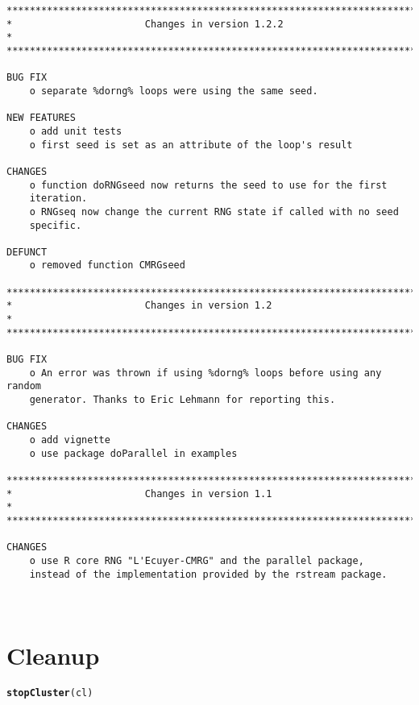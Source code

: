 \documentclass[a4paper,12pt]{article}\usepackage{graphicx, color}
\makeatletter
\newcommand{\hlfunctioncall}[1]{\textcolor[rgb]{0.501960784313725,0,0.329411764705882}{\textbf{#1}}}%
\newenvironment{kframe}{%
 \def\at@end@of@kframe{}%
 \ifinner\ifhmode%
  \def\at@end@of@kframe{\end{minipage}}%
  \begin{minipage}{\columnwidth}%
 \fi\fi%
 \def\FrameCommand##1{\hskip\@totalleftmargin \hskip-\fboxsep
 \colorbox{shadecolor}{##1}\hskip-\fboxsep
     \hskip-\linewidth \hskip-\@totalleftmargin \hskip\columnwidth}%
 \MakeFramed {\advance\hsize-\width
   \@totalleftmargin\z@ \linewidth\hsize
   \@setminipage}}%
 {\par\unskip\endMakeFramed%
 \at@end@of@kframe}
\newenvironment{knitrout}{}{} %
\renewenvironment{knitrout}{\begin{footnotesize}}{\end{footnotesize}}
\makeatother
\begin{document}
{\begin{verbatim}
*************************************************************************
*                       Changes in version 1.2.2                        *
*************************************************************************

BUG FIX
    o separate %dorng% loops were using the same seed.

NEW FEATURES
    o add unit tests
    o first seed is set as an attribute of the loop's result

CHANGES
    o function doRNGseed now returns the seed to use for the first 
    iteration.
    o RNGseq now change the current RNG state if called with no seed 
    specific.  
    
DEFUNCT
    o removed function CMRGseed

*************************************************************************
*                       Changes in version 1.2                          *
*************************************************************************

BUG FIX
    o An error was thrown if using %dorng% loops before using any random
    generator. Thanks to Eric Lehmann for reporting this.

CHANGES
    o add vignette
    o use package doParallel in examples

*************************************************************************
*                       Changes in version 1.1                          *
*************************************************************************

CHANGES
    o use R core RNG "L'Ecuyer-CMRG" and the parallel package, 
    instead of the implementation provided by the rstream package.



\end{verbatim}
}


\section*{Cleanup}
\begin{knitrout}
\color{fgcolor}\begin{kframe}
\begin{alltt}
\hlfunctioncall{stopCluster}(cl)
\end{alltt}
\end{kframe}
\end{knitrout}
\end{document}
